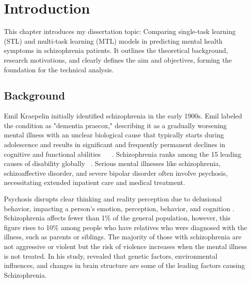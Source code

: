 \def\baselinestretch{1}

\chapter{Introduction}

\def\baselinestretch{1.44}


This chapter introduces my dissertation topic: Comparing single-task learning (STL) and multi-task learning (MTL) models in predicting mental health symptoms in schizophrenia patients. It outlines the theoretical background, research motivations, and clearly defines the aim and objectives, forming the foundation for the technical analysis.

\smallskip

\goodbreak
\section{Background}
Emil Kraepelin initially identified schizophrenia in the early 1900s. Emil labeled the condition as "dementia praecox," describing it as a gradually worsening mental illness with an unclear biological cause that typically starts during adolescence and results in significant and frequently permanent declines in cognitive and functional abilities ~ \citep{mcglashan1996early}~. Schizophrenia ranks among the 15 leading causes of disability globally ~\citep{james2020global}. Serious mental illnesses like schizophrenia, schizoaffective disorder, and severe bipolar disorder often involve psychosis, necessitating extended inpatient care and medical treatment. 

Psychosis disrupts clear thinking and reality perception due to delusional behavior, impacting a person's emotion, perception, behavior, and cognition \citep{wang2020predicting}. Schizophrenia affects fewer than 1\% of the general population, however, this figure rises to 10\% among people who have relatives who were diagnosed with the illness, such as parents or siblings. The majority of those with schizophrenia are not aggressive or violent but the risk of violence increases when the mental illness is not treated. In his study, \citet{Rasool2018SchizophreniaAO} revealed that genetic factors, environmental influences, and changes in brain structure are some of the leading factors causing Schizophrenia.

